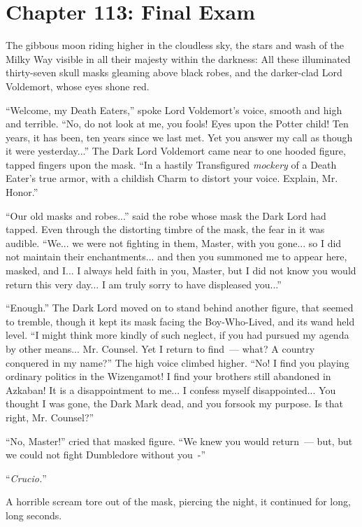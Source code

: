 \chapter{Chapter 113: Final Exam}
The gibbous moon riding higher in the cloudless sky, the stars and wash of the Milky Way visible in all their majesty within the darkness: All these illuminated thirty-seven skull masks gleaming above black robes, and the darker-clad Lord Voldemort, whose eyes shone red.

``Welcome, my Death Eaters,'' spoke Lord Voldemort's voice, smooth and high and terrible. ``No, do not look at me, you fools! Eyes upon the Potter child! Ten years, it has been, ten years since we last met. Yet you answer my call as though it were yesterday...'' The Dark Lord Voldemort came near to one hooded figure, tapped fingers upon the mask. ``In a hastily Transfigured \emph{mockery} of a Death Eater's true armor, with a childish Charm to distort your voice. Explain, Mr. Honor.''

``Our old masks and robes...'' said the robe whose mask the Dark Lord had tapped. Even through the distorting timbre of the mask, the fear in it was audible. ``We... we were not fighting in them, Master, with you gone... so I did not maintain their enchantments... and then you summoned me to appear here, masked, and I... I always held faith in you, Master, but I did not know you would return this very day... I am truly sorry to have displeased you...''

``Enough.'' The Dark Lord moved on to stand behind another figure, that seemed to tremble, though it kept its mask facing the Boy-Who-Lived, and its wand held level. ``I might think more kindly of such neglect, if you had pursued my agenda by other means... Mr. Counsel. Yet I return to find~--- what? A country conquered in my name?'' The high voice climbed higher. ``No! I find you playing ordinary politics in the Wizengamot! I find your brothers still abandoned in Azkaban! It is a disappointment to me... I confess myself disappointed... You thought I was gone, the Dark Mark dead, and you forsook my purpose. Is that right, Mr. Counsel?''

``No, Master!'' cried that masked figure. ``We knew you would return~--- but, but we could not fight Dumbledore without you~-''

``\emph{Crucio.}''

A horrible scream tore out of the mask, piercing the night, it continued for long, long seconds.

